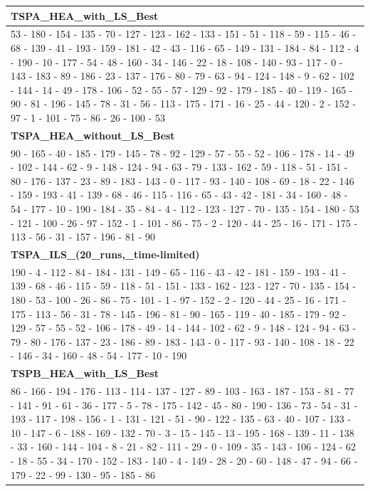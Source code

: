 \begin{table}[h!]
\centering
\begin{tabular}{|p{14cm}|}
\hline
\textbf{TSPA\_HEA\_with\_LS\_Best} \\ \hline
53 - 180 - 154 - 135 - 70 - 127 - 123 - 162 - 133 - 151 - 51 - 118 - 59 - 115 - 46 - 68 - 139 - 41 - 193 - 159 - 181 - 42 - 43 - 116 - 65 - 149 - 131 - 184 - 84 - 112 - 4 - 190 - 10 - 177 - 54 - 48 - 160 - 34 - 146 - 22 - 18 - 108 - 140 - 93 - 117 - 0 - 143 - 183 - 89 - 186 - 23 - 137 - 176 - 80 - 79 - 63 - 94 - 124 - 148 - 9 - 62 - 102 - 144 - 14 - 49 - 178 - 106 - 52 - 55 - 57 - 129 - 92 - 179 - 185 - 40 - 119 - 165 - 90 - 81 - 196 - 145 - 78 - 31 - 56 - 113 - 175 - 171 - 16 - 25 - 44 - 120 - 2 - 152 - 97 - 1 - 101 - 75 - 86 - 26 - 100 - 53 \\ \hline
\textbf{TSPA\_HEA\_without\_LS\_Best} \\ \hline
90 - 165 - 40 - 185 - 179 - 145 - 78 - 92 - 129 - 57 - 55 - 52 - 106 - 178 - 14 - 49 - 102 - 144 - 62 - 9 - 148 - 124 - 94 - 63 - 79 - 133 - 162 - 59 - 118 - 51 - 151 - 80 - 176 - 137 - 23 - 89 - 183 - 143 - 0 - 117 - 93 - 140 - 108 - 69 - 18 - 22 - 146 - 159 - 193 - 41 - 139 - 68 - 46 - 115 - 116 - 65 - 43 - 42 - 181 - 34 - 160 - 48 - 54 - 177 - 10 - 190 - 184 - 35 - 84 - 4 - 112 - 123 - 127 - 70 - 135 - 154 - 180 - 53 - 121 - 100 - 26 - 97 - 152 - 1 - 101 - 86 - 75 - 2 - 120 - 44 - 25 - 16 - 171 - 175 - 113 - 56 - 31 - 157 - 196 - 81 - 90 \\ \hline
\textbf{TSPA\_ILS\_(20\_runs,\_time-limited)} \\ \hline
190 - 4 - 112 - 84 - 184 - 131 - 149 - 65 - 116 - 43 - 42 - 181 - 159 - 193 - 41 - 139 - 68 - 46 - 115 - 59 - 118 - 51 - 151 - 133 - 162 - 123 - 127 - 70 - 135 - 154 - 180 - 53 - 100 - 26 - 86 - 75 - 101 - 1 - 97 - 152 - 2 - 120 - 44 - 25 - 16 - 171 - 175 - 113 - 56 - 31 - 78 - 145 - 196 - 81 - 90 - 165 - 119 - 40 - 185 - 179 - 92 - 129 - 57 - 55 - 52 - 106 - 178 - 49 - 14 - 144 - 102 - 62 - 9 - 148 - 124 - 94 - 63 - 79 - 80 - 176 - 137 - 23 - 186 - 89 - 183 - 143 - 0 - 117 - 93 - 140 - 108 - 18 - 22 - 146 - 34 - 160 - 48 - 54 - 177 - 10 - 190 \\ \hline
\textbf{TSPB\_HEA\_with\_LS\_Best} \\ \hline
86 - 166 - 194 - 176 - 113 - 114 - 137 - 127 - 89 - 103 - 163 - 187 - 153 - 81 - 77 - 141 - 91 - 61 - 36 - 177 - 5 - 78 - 175 - 142 - 45 - 80 - 190 - 136 - 73 - 54 - 31 - 193 - 117 - 198 - 156 - 1 - 131 - 121 - 51 - 90 - 122 - 135 - 63 - 40 - 107 - 133 - 10 - 147 - 6 - 188 - 169 - 132 - 70 - 3 - 15 - 145 - 13 - 195 - 168 - 139 - 11 - 138 - 33 - 160 - 144 - 104 - 8 - 21 - 82 - 111 - 29 - 0 - 109 - 35 - 143 - 106 - 124 - 62 - 18 - 55 - 34 - 170 - 152 - 183 - 140 - 4 - 149 - 28 - 20 - 60 - 148 - 47 - 94 - 66 - 179 - 22 - 99 - 130 - 95 - 185 - 86 \\ \hline

\end{tabular}
\end{table}
